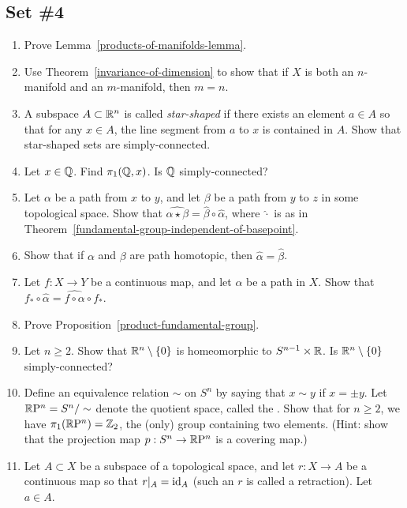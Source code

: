 \subsection{Set \#4}
\begin{enumerate}[label=4.\arabic*]
  \item \label{products-of-manifolds-exercise} Prove Lemma~\ref{products-of-manifolds-lemma}.
  \item \label{invariance-of-dimension-manifolds} Use Theorem~\ref{invariance-of-dimension} to show that if $X$ is both an $n$-manifold and an $m$-manifold, then $m = n$.
  \item A subspace $A \subset \mathbb{R}^n$ is called \emph{star-shaped} if there exists an element $a \in A$ so that for any $x \in A$, the line segment from $a$ to $x$ is contained in $A$. Show that star-shaped sets are simply-connected.
  \item Let $x \in \mathbb{Q}$. Find $\pi_1(\mathbb{Q},x)$. Is $\mathbb{Q}$ simply-connected?
  \item Let $\alpha$ be a path from $x$ to $y$, and let $\beta$ be a path from $y$ to $z$ in some topological space. Show that $\widehat{\alpha \star \beta} = \widehat{\beta} \circ \widehat{\alpha}$, where $\hat{\cdot}$ is as in Theorem~\ref{fundamental-group-independent-of-basepoint}.
  \item Show that if $\alpha$ and $\beta$ are path homotopic, then $\hat{\alpha} = \hat{\beta}$.
  \item Let $f : X \to Y$ be a continuous map, and let $\alpha$ be a path in $X$. Show that $f_* \circ \hat{\alpha} = \widehat{f \circ \alpha} \circ f_*$. 
  \item \label{product-fundamental-group-exercise} Prove Proposition~\ref{product-fundamental-group}.
  \item Let $n \geq 2$. Show that $\mathbb{R}^n \setminus \{0\}$ is homeomorphic to $S^{n-1} \times \mathbb{R}$. Is $\mathbb{R}^n \setminus \{0\}$ simply-connected?
  \item Define an equivalence relation $\sim$ on $S^n$ by saying that $x \sim y$ if $x = \pm y$. Let $\mathbb{R}\mathrm{P}^n = S^n/\sim$ denote the quotient space, called the . Show that for $n \geq 2$, we have $\pi_1(\mathbb{R}\mathrm{P}^n) = \mathbb{Z}_2$, the (only) group containing two elements. (Hint: show that the projection map $p : S^n \to \mathbb{R}\mathrm{P}^n$ is a covering map.)
  \item Let $A \subset X$ be a subspace of a topological space, and let $r : X \to A$ be a continuous map so that $r|_A = \mathrm{id}_A$ (such an $r$ is called a retraction). Let $a \in A$.

\end{enumerate}

